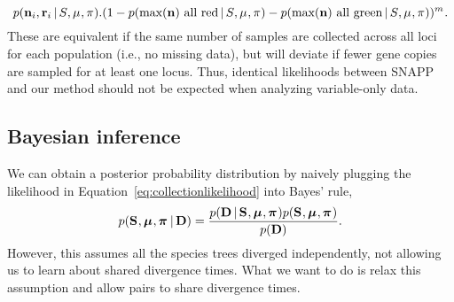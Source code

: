 \begin{linenomath}
\begin{equation}
{        \pr(\leafallelecounts[i], \leafredallelecounts[i] \given \sptree, \murate, \gfreq).
    }{
        (1 - \pr(\maxleafallelecounts \textrm{ all red} \given \sptree, \murate, \gfreq)
        - \pr(\maxleafallelecounts \textrm{ all green} \given \sptree, \murate, \gfreq))^{\nloci}
    }.
    \label{eq:snappvariablecomparisonlikelihood}
\end{equation}
These are equivalent if the same number of samples are collected across all
loci for each population (i.e., no missing data), but will deviate if fewer
gene copies are sampled for at least one locus.
Thus, identical likelihoods between SNAPP and our method should not be expected
when analyzing variable-only data.
\end{linenomath}

\subsection{Bayesian inference}

\begin{linenomath}
We can obtain a posterior probability distribution by naively plugging the
likelihood in Equation~\ref{eq:collectionlikelihood} into Bayes' rule,
\begin{equation}
    p(
    \mathbf{S}_{},
    \boldsymbol{\mu}_{},
    \boldsymbol{\pi}_{}
    \,|\,
    \mathbf{D}
    )
    =
    \frac{
        p(
        \mathbf{D}
        \,|\,
        \mathbf{S}_{}, \boldsymbol{\mu}_{}, \boldsymbol{\pi}_{}
        )
        p(
        \mathbf{S}_{},
        \boldsymbol{\mu}_{},
        \boldsymbol{\pi}_{}
        )
    }{
        p(
        \mathbf{D}
        )
    }.
    \label{eq:collectionindependentbayesrule}
\end{equation}
However, this assumes all the species trees diverged independently, not
allowing us to learn about shared divergence times.
What we want to do is relax this assumption and allow pairs to share divergence
times.
\end{linenomath}

